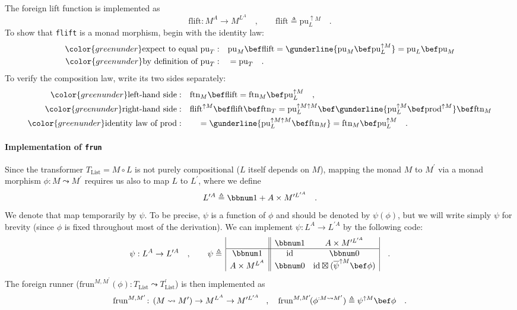 The foreign lift function is implemented as
\[
\text{flift}:M^{A}\rightarrow M^{L^{A}}\quad,\quad\quad\text{flift}\triangleq\text{pu}_{L}^{\uparrow M}\quad.
\]
To show that \lstinline!flift! is a monad morphism, begin with the
identity law:
\begin{align*}
{\color{greenunder}\text{expect to equal }\text{pu}_{T}:}\quad & \text{pu}_{M}\bef\text{flift}=\gunderline{\text{pu}_{M}\bef\text{pu}_{L}^{\uparrow M}}=\text{pu}_{L}\bef\text{pu}_{M}\\
{\color{greenunder}\text{by definition of }\text{pu}_{T}:}\quad & =\text{pu}_{T}\quad.
\end{align*}
To verify the composition law, write its two sides separately:
\begin{align*}
{\color{greenunder}\text{left-hand side}:}\quad & \text{ftn}_{M}\bef\text{flift}=\text{ftn}_{M}\bef\text{pu}_{L}^{\uparrow M}\quad,\\
{\color{greenunder}\text{right-hand side}:}\quad & \text{flift}^{\uparrow M}\bef\text{flift}\bef\text{ftn}_{T}=\text{pu}_{L}^{\uparrow M\uparrow M}\bef\gunderline{\text{pu}_{L}^{\uparrow M}\bef\text{prod}^{\uparrow M}}\bef\text{ftn}_{M}\\
{\color{greenunder}\text{identity law of }\text{prod}:}\quad & \quad=\gunderline{\text{pu}_{L}^{\uparrow M\uparrow M}\bef\text{ftn}_{M}}=\text{ftn}_{M}\bef\text{pu}_{L}^{\uparrow M}\quad.
\end{align*}


\paragraph{Implementation of \texttt{frun}}

Since the transformer $T_{\text{List}}=M\circ L$ is not purely compositional
($L$ itself depends on $M$), mapping the monad $M$ to $M^{\prime}$
via a monad morphism $\phi:M\leadsto M^{\prime}$ requires us also
to map $L$ to $L^{\prime}$, where we define 
\[
L^{\prime A}\triangleq\bbnum 1+A\times M^{\prime L^{\prime A}}\quad.
\]
We denote that map temporarily by $\psi$. To be precise, $\psi$
is a function of $\phi$ and should be denoted by $\psi(\phi)$, but
we will write simply $\psi$ for brevity (since $\phi$ is fixed throughout
most of the derivation). We can implement $\psi:L^{A}\rightarrow L^{\prime A}$
by the following code:
\begin{equation}
\psi:L^{A}\rightarrow L^{\prime A}\quad,\quad\quad\psi\triangleq\,\begin{array}{|c||cc|}
 & \bbnum 1 & A\times M^{\prime L^{\prime A}}\\
\hline \bbnum 1 & \text{id} & \bbnum 0\\
A\times M^{L^{A}} & \bbnum 0 & \text{id}\boxtimes(\overline{\psi}^{\uparrow M}\bef\phi)
\end{array}\quad.\label{eq:list-monad-definition-of-psi}
\end{equation}
The foreign runner ($\text{frun}^{M,M^{\prime}}(\phi):T_{\text{List}}\leadsto T_{\text{List}}^{\prime}$)
is then implemented as
\[
\text{frun}^{M,M^{\prime}}\!:\,(M\leadsto M^{\prime})\rightarrow M^{L^{A}}\rightarrow M^{\prime L^{\prime A}}\!\quad,\quad\text{frun}^{M,M^{\prime}}\!(\phi^{:M\leadsto M^{\prime}})\triangleq\psi^{\uparrow M}\bef\phi\quad.
\]


